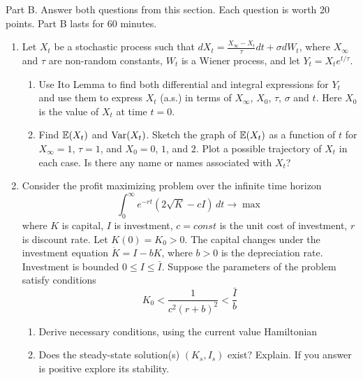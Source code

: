 \documentclass[pdftex,12pt,a4paper]{article}
\begin{document}
Part B.
Answer both questions from this section. Each question is worth 20 points.
Part B lasts for 60 minutes.
\begin{enumerate}[resume]
\item Let $X_t$ be a stochastic process such that
$dX_t=\frac{X_{\infty}-X_t}{\tau}dt+\sigma dW_t$, where $X_{\infty}$ and $\tau$ are non-random constants, $W_t$ is a Wiener process, and let $Y_t=X_t e^{t/\tau}$.
\begin{enumerate}
\item Use Ito Lemma to find both differential and integral expressions for $Y_t$ and use them to express $X_t$ (a.s.) in terms of $X_{\infty}$, $X_0$, $\tau$, $\sigma$ and $t$. Here $X_0$ is the value of $X_t$ at time $t=0$.
\item Find $\mathbb{E}(X_t)$ and $\operatorname{Var}(X_t)$. Sketch the graph of $\mathbb{E}(X_t)$ as a function of $t$ for $X_{\infty}=1$, $\tau=1$, and $X_0 = 0$, $1$, and $2$. Plot a possible trajectory of $X_t$ in each case. Is there any name or names associated with $X_t$? 
\end{enumerate}

\item Consider the profit maximizing problem over the infinite time horizon
\[
\int_0^{\infty} e^{-rt}(2\sqrt{K}-cI)\, dt \to \max
\]
where $K$ is capital, $I$ is investment, $c=const$ is the unit cost of investment, $r$ is discount rate. Let $K(0)=K_0>0$. The capital changes under the investment equation $\dot{K}=I-bK$, where $b>0$ is the depreciation rate. Investment is bounded $0\leq I\leq \bar{I}$. Suppose the parameters of the problem satisfy conditions
\[
K_0 < \frac{1}{c^2(r+b)^2} < \frac{\bar{I}}{b}
\]
\begin{enumerate}
\item Derive necessary conditions, using the current value Hamiltonian
\item Does the steady-state solution(s) $(K_s,I_s)$ exist? Explain. If you answer is positive explore its stability.
\end{enumerate}

\end{enumerate}
\end{document}
